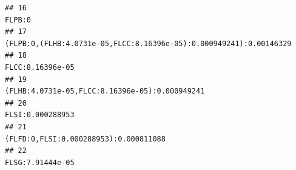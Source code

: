 \documentclass[]{article}
\begin{document}
\begin{verbatim}
## 16                                                                                                                                                                                                                                                                                                                                                                                                                                     FLPB:0
## 17                                                                                                                                                                                                                                                                                                                                                                         (FLPB:0,(FLHB:4.0731e-05,FLCC:8.16396e-05):0.000949241):0.00146329
## 18                                                                                                                                                                                                                                                                                                                                                                                                                           FLCC:8.16396e-05
## 19                                                                                                                                                                                                                                                                                                                                                                                             (FLHB:4.0731e-05,FLCC:8.16396e-05):0.000949241
## 20                                                                                                                                                                                                                                                                                                                                                                                                                           FLSI:0.000288953
## 21                                                                                                                                                                                                                                                                                                                                                                                                      (FLFD:0,FLSI:0.000288953):0.000811088
## 22                                                                                                                                                                                                                                                                                                                                                                                                                           FLSG:7.91444e-05

\end{verbatim}
\end{document}
